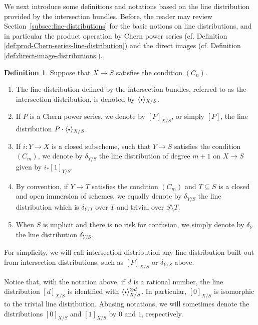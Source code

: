 \documentclass[11pt]{article}
\newcommand{\cf}{cf.\xspace}
\newcommand{\sbullet}{{\scriptscriptstyle\bullet}}
\newcommand{\csbullet}{{\raisebox{1pt}{$\sbullet$}}}
\theoremstyle{plain}
\theoremstyle{definition}
\newtheorem{definition}[theorem]{Definition}
\begin{document}
We next introduce some definitions and notations based on the line distribution provided by the intersection bundles. Before, the reader may review Section~\ref{subsec:line-distributions} for the basic notions on line distributions, and in particular the product operation by Chern power series (\cf Definition \ref{def:prod-Chern-series-line-distribution}) and the direct images (\cf Definition \ref{def:direct-image-distributions}).

\begin{definition}\label{definition:intersectiondistribution}
Suppose that $X\to S$ satisfies the condition $(C_n)$.

\begin{enumerate}
\item The line distribution defined by the intersection bundles, referred to as the intersection distribution, is denoted by $\langle \csbullet \rangle_{X/S}$.
\item If $P$ is a Chern power series, we denote by $[ P ]_{X/S}$, or simply $[P]$, the line distribution $P \cdot \langle \csbullet \rangle_{X/S}$.
\item If $i\colon Y \to X$ is a closed subscheme, such that $Y \to S$ satisfies the condition $(C_m)$, we denote by $\delta_{Y/S}$ the line distribution of degree $m+1$ on $X \to S$ given by $i_\ast[ 1 ]_{Y/S} $.
\item By convention, if $Y \to T$ satisfies the condition $(C_m)$ and $T \subseteq S$ is a closed and open immersion of schemes, we equally denote by $\delta_{Y/S}$ the line distribution which is $\delta_{Y/T}$ over $T$ and trivial over $S\setminus T$.
\item When $S$ is implicit and there is no risk for confusion, we simply denote by $\delta_{Y}$ the line distribution $\delta_{Y/S}$.
\end{enumerate}
\end{definition}

For simplicity, we will call intersection distribution any line distribution built out from intersection distributions, such as $[P]_{X/S}$ or $\delta_{Y/S}$ above.

Notice that, with the notation above, if $d$ is a rational number, the line distribution $[d]_{X/S}$ is identified with $\langle\csbullet\rangle_{X/S}^{\otimes d}$. In particular, $[0]_{X/S}$ is isomorphic to the trivial line distribution. Abusing notations, we will sometimes denote the distributions $[0]_{X/S}$ and $[1]_{X/S}$ by $0$ and $1$, respectively.
\end{document}
